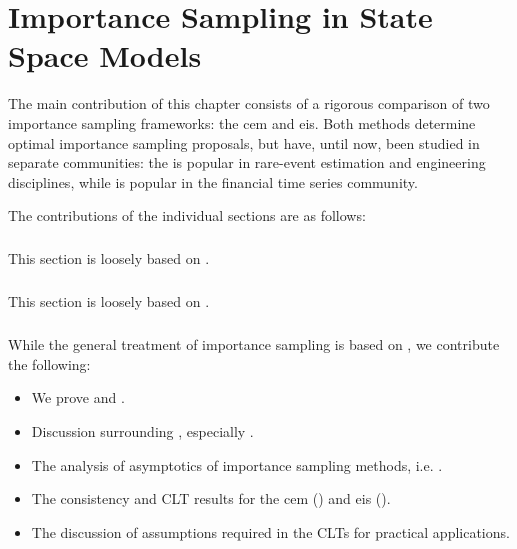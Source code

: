 \chapter{Importance Sampling in State Space Models}
\label{cha:state_space_models}
\newpage
\begin{tcolorbox}[title={Contributions}]
    The main contribution of this chapter consists of a rigorous comparison of two importance sampling frameworks: the \gls{cem} and \gls{eis}. Both methods determine optimal importance sampling proposals, but have, until now, been studied in separate communities: the \acem is popular in rare-event estimation and engineering disciplines, while \aeis is popular in the financial time series community. 

    The contributions of the individual sections are as follows:


    \paragraph{} This section is loosely based on \citep{Durbin2012Time}.
    \paragraph{} This section is loosely based on \citep{Durbin2012Time,Brown1986Fundamentals}.
    \paragraph{} While the general treatment of importance sampling is based on \citep{Chopin2020Introduction,Durbin2012Time}, we contribute the following:
    \begin{itemize}
        \item We prove  and .
        \item Discussion surrounding , especially .
        \item The analysis of asymptotics of importance sampling methods, i.e. .
        \item The consistency and CLT results for the \gls{cem} () and \gls{eis} ().
        \item The discussion of assumptions required in the CLTs for practical applications.
    \end{itemize}


\end{tcolorbox}

